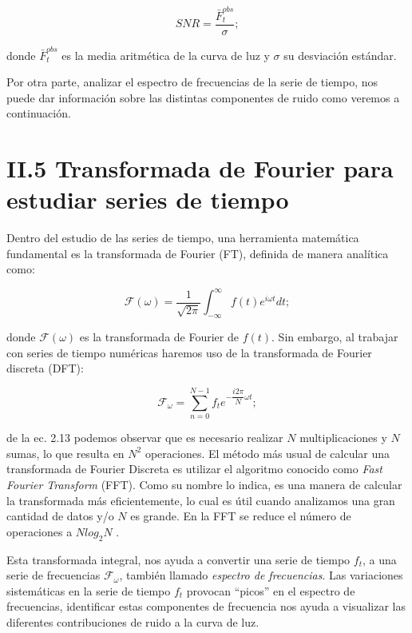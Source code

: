\begin{equation}
  \displaystyle SNR=\dfrac{\bar{F}^{obs}_{t}}{\sigma};
\end{equation}

\noindent donde $\bar{F}^{obs}_{t}$ es la media aritmética de la curva de luz y $\sigma$ su desviación estándar.

Por otra parte, analizar el espectro de frecuencias de la serie de tiempo, nos puede dar información sobre las distintas componentes de ruido como veremos a continuación.

\section*{II.5 Transformada de Fourier para estudiar series de tiempo}

Dentro del estudio de las series de tiempo, una herramienta matemática fundamental es la transformada de Fourier (FT), definida de manera analítica como:

\begin{equation}
  \displaystyle \mathcal{F}(\omega )=\frac{1}{\sqrt{2\pi}}\int_{-\infty}^{\infty} f(t)e^{i\omega t}dt;
\end{equation}

\noindent donde $\mathcal{F}(\omega )$ es la transformada de Fourier de $f(t)$. Sin embargo, al trabajar con series de tiempo numéricas haremos uso de la transformada de Fourier discreta (DFT):  

\begin{equation}
  \displaystyle \mathcal{F}_{\omega}= \sum_{n=0}^{N-1} f_{t}e^{-\dfrac{i2\pi}{N}\omega t};
\end{equation}

\noindent de la ec. 2.13 podemos observar que es necesario realizar $N$ multiplicaciones y $N$ sumas, lo que resulta en $N^{2}$ operaciones. El método más usual de calcular una transformada de Fourier Discreta es utilizar el algoritmo conocido como \textit{Fast Fourier Transform} (FFT). Como su nombre lo indica, es una manera de calcular la transformada más eficientemente, lo cual es útil cuando analizamos una gran cantidad de datos y/o $N$ es grande. En la FFT se reduce el número de operaciones a $Nlog_{2}N$ \cite{cooley1965algorithm}. 

Esta transformada integral, nos ayuda a convertir una serie de tiempo $f_{t}$, a una serie de frecuencias $\mathcal{F}_{\omega}$, también llamado \textit{espectro de frecuencias}. Las variaciones sistemáticas en la serie de tiempo $f_{t}$ provocan ``picos'' en el espectro de frecuencias, identificar estas componentes de frecuencia nos ayuda a visualizar las diferentes contribuciones de ruido a la curva de luz.

